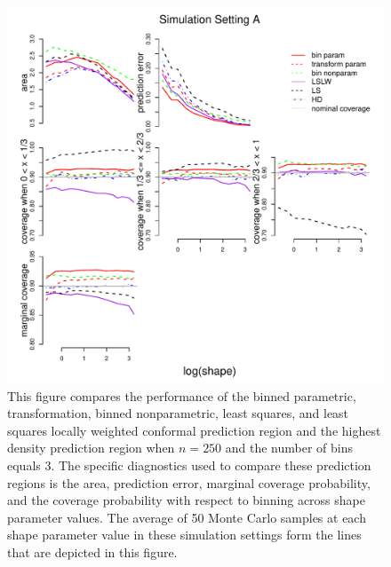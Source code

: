 \documentclass[11pt]{article}\usepackage[]{graphicx}\usepackage[]{color}
\makeatletter
\def\maxwidth{ %
  \ifdim\Gin@nat@width>\linewidth
    \linewidth
  \else
    \Gin@nat@width
  \fi
}
\newenvironment{knitrout}{}{} %
\makeatother
\begin{document}
\newpage
\begin{figure}[h!]
\begin{center}
\begin{knitrout}
\color{fgcolor}
\includegraphics[width=\maxwidth]{figure/Fig-gamma-250-1} 

\end{knitrout}
\end{center}
\caption{This figure compares the performance of the 
  binned parametric,
  transformation,
  binned nonparametric,
  least squares, and 
  least squares locally weighted conformal prediction region and the 
  highest density prediction region when $n = 250$ and the number of bins 
  equals 3.  
  The specific diagnostics used to compare these prediction regions is the 
    area,
    prediction error, 
    marginal coverage probability,
    and the coverage probability with respect to binning 
    across shape parameter values.
  The average of 50 Monte Carlo samples at each shape parameter value in 
  these simulation settings form the lines that are depicted in this figure.}
\label{Fig:gamma.250}
\end{figure}
\end{document}
